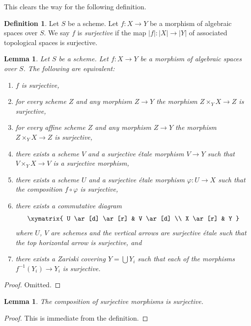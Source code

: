 \documentclass{stacks-project}
\theoremstyle{plain}
\newtheorem{lemma}[subsection]{Lemma}
\theoremstyle{definition}
\newtheorem{definition}[subsection]{Definition}
\theoremstyle{remark}
\numberwithin{equation}{subsection}
\begin{document}
\noindent
This clears the way for the following definition.

\begin{definition}
\label{definition-surjective}
Let $S$ be a scheme. Let $f : X \to Y$ be a morphism of algebraic
spaces over $S$. We say $f$ is {\it surjective}
if the map $|f| : |X| \to |Y|$ of associated topological spaces
is surjective.
\end{definition}

\begin{lemma}
\label{lemma-surjective-local}
Let $S$ be a scheme.
Let $f : X \to Y$ be a morphism of algebraic spaces over $S$.
The following are equivalent:
\begin{enumerate}
\item $f$ is surjective,
\item for every scheme $Z$ and any morphism $Z \to Y$ the morphism
$Z \times_Y X \to Z$ is surjective,
\item for every affine scheme $Z$ and any morphism
$Z \to Y$ the morphism $Z \times_Y X \to Z$ is surjective,
\item there exists a scheme $V$ and a surjective \'etale morphism
$V \to Y$ such that $V \times_Y X \to V$ is a surjective morphism,
\item there exists a scheme $U$ and a surjective \'etale morphism
$\varphi : U \to X$ such that the composition $f \circ \varphi$
is surjective,
\item there exists a commutative diagram
$$
\xymatrix{
U \ar[d] \ar[r] & V \ar[d] \\
X \ar[r] & Y
}
$$
where $U$, $V$ are schemes and the vertical arrows are surjective \'etale
such that the top horizontal arrow is surjective, and
\item there exists a Zariski covering $Y = \bigcup Y_i$ such that
each of the morphisms $f^{-1}(Y_i) \to Y_i$ is surjective.
\end{enumerate}
\end{lemma}

\begin{proof}
Omitted.
\end{proof}

\begin{lemma}
\label{lemma-composition-surjective}
The composition of surjective morphisms is surjective.
\end{lemma}

\begin{proof}
This is immediate from the definition.
\end{proof}
\end{document}
